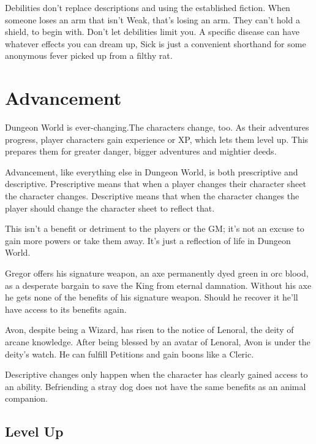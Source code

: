        

Debilities don't replace descriptions and using the established fiction. When someone loses an arm that isn't Weak, that's losing an arm. They can't hold a shield, to begin with. Don't let debilities limit you. A specific disease can have whatever effects you can dream up, Sick is just a convenient shorthand for some anonymous fever picked up from a filthy rat.

       
\section{Advancement}   
       

Dungeon World is ever-changing.The characters change, too. As their adventures progress, player characters gain experience or XP, which lets them level up. This prepares them for greater danger, bigger adventures and mightier deeds.

       

Advancement, like everything else in Dungeon World, is both prescriptive and descriptive. Prescriptive means that when a player changes their character sheet the character changes. Descriptive means that when the character changes the player should change the character sheet to reflect that.

       

This isn't a benefit or detriment to the players or the GM; it's not an excuse to gain more powers or take them away. It's just a reflection of life in Dungeon World.

       
\startExample
Gregor offers his signature weapon, an axe permanently dyed green in orc blood, as a desperate bargain to save the King from eternal damnation. Without his axe he gets none of the benefits of his signature weapon. Should he recover it he'll have access to its benefits again.
\stopExample
       
\startExample
Avon, despite being a Wizard, has risen to the notice of Lenoral, the deity of arcane knowledge. After being blessed by an avatar of Lenoral, Avon is under the deity's watch. He can fulfill Petitions and gain boons like a Cleric.
\stopExample
       

Descriptive changes only happen when the character has clearly gained access to an ability. Befriending a stray dog does not have the same benefits as an animal companion.

       
\subsection{Level Up}   
       

